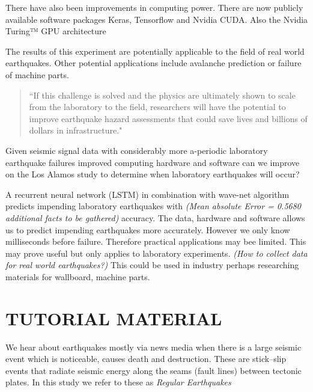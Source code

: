 \documentclass[]{llncs}
\begin{document}
There have also been improvements in computing power. There are now publicly available software packages Keras, Tensorflow and Nvidia CUDA. Also the Nvidia Turing™ GPU architecture \par

The results of this experiment are potentially applicable to the field of real world earthquakes. Other potential applications include avalanche prediction or failure of machine parts.
\begin{quote}
	“If this challenge is solved and the physics are ultimately shown to scale from the laboratory to the field, researchers will have the potential to improve earthquake hazard assessments that could save lives and billions of dollars in infrastructure.\cite{kaggle}"
\end{quote}

Given seismic signal data with considerably more a-periodic laboratory earthquake failures improved computing hardware and software can we improve on the Los Alamos study\cite{Bertrand} to determine when laboratory earthquakes will occur?\par



A recurrent neural network (LSTM) in combination with wave-net algorithm predicts impending laboratory earthquakes with {\em (Mean absolute Error = 0.5680 additional facts to be gathered)} accuracy.
The data, hardware and software allows us to predict impending earthquakes more accurately. However we only know milliseconds before failure. Therefore practical applications may bee limited. This may prove useful but only applies to laboratory experiments. {\em (How to collect data for real world earthquakes?)}  This could be used in industry perhaps researching materials for wallboard, machine parts.\par


\section{TUTORIAL MATERIAL}
We hear about earthquakes mostly via news media when there is a large seismic event which is noticeable, causes death and destruction. These are stick–slip events that radiate seismic energy along the seams (fault lines) between tectonic plates. In this study we refer to these as {\em Regular Earthquakes} \par
\end{document}
